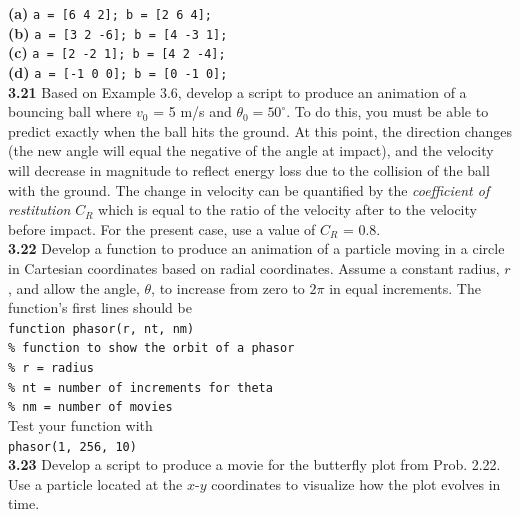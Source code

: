 \documentclass[../main.tex]{subfiles}
\begin{document}
\begin{multicols}{2}
    \noindent
    \textbf{(a)} \texttt{a = [6 4 2]; b = [2 6 4];}\\
    \textbf{(b)} \texttt{a = [3 2 -6]; b = [4 -3 1];}\\
    \textbf{(c)} \texttt{a = [2 -2 1]; b = [4 2 -4];}\\
    \textbf{(d)} \texttt{a = [-1 0 0]; b = [0 -1 0];}\\

    \noindent\textbf{3.21} Based on Example 3.6, develop a script to produce an
    animation of a bouncing ball where $v_0$ = 5 m/s and $\theta_0 = 50^{\circ}$.
    To do this, you must be able to predict exactly when the ball
    hits the ground. At this point, the direction changes (the new
    angle will equal the negative of the angle at impact), and the
    velocity will decrease in magnitude to reflect energy loss
    due to the collision of the ball with the ground. The change
    in velocity can be quantified by the \emph{coefficient of restitution}
    $C_R$ which is equal to the ratio of the velocity after to the velocity
    before impact. For the present case, use a value of
    $C_R$ = 0.8.\\

    \noindent\textbf{3.22} Develop a function to produce an animation of a particle
    moving in a circle in Cartesian coordinates based on radial
    coordinates. Assume a constant radius, $r$, and allow the
    angle, $\theta$, to increase from zero to $2\pi$ in equal increments.
    The function's first lines should be\\

    \texttt{function phasor(r, nt, nm)\\
    \indent \% function to show the orbit of
    \indent\hspace{40mm} a phasor\\
    \indent \% r = radius\\
    \indent \% nt = number of increments for 
    \indent\hspace{50mm}theta\\
    \indent \% nm = number of movies}\\

    \noindent Test your function with\\

    \texttt{phasor(1, 256, 10)}\\

    \noindent\textbf{3.23} Develop a script to produce a movie for the butterfly
    plot from Prob. 2.22. Use a particle located at the $x$-$y$ coordinates
    to visualize how the plot evolves in time.
\end{multicols}
\end{document}
